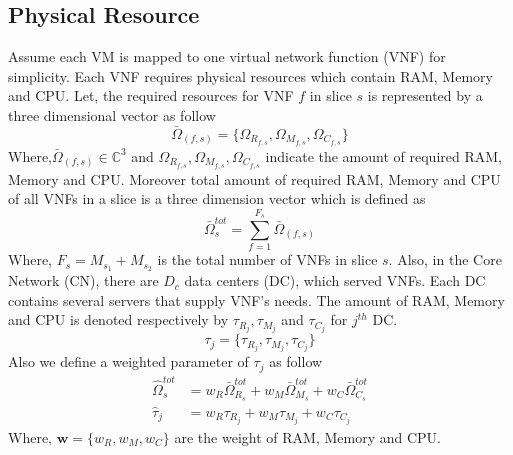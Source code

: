 \documentclass[conference]{IEEEtran}
\begin{document}
\subsection{Physical Resource}
Assume each VM is mapped to one virtual network function (VNF) for simplicity. Each VNF requires
physical resources which contain RAM, Memory and CPU.
Let, the required resources for VNF $f$ in slice $s$ is represented by a three dimensional vector as follow
\begin{equation}
\bar{\Omega}_{(f,s)} = \{\Omega_{R_{f,s}}, \Omega_{M_{f,s}}, \Omega_{C_{f,s}} \}
\end{equation} 
Where,$\bar{\Omega}_{(f,s)}\in \mathbb{C}^{3}$ and $\Omega_{R_{f,s}}, \Omega_{M_{f,s}}, \Omega_{C_{f,s}}$ indicate the amount of required RAM, Memory and CPU.
Moreover total amount of required RAM, Memory and CPU of all VNFs in a slice is a three dimension vector which is defined as
\begin{equation}
\bar{\Omega}_{s}^{tot} = \sum_{f=1}^{F_s}\bar{\Omega}_{(f,s)}
\end{equation}
Where, $F_s = M_{s_1} + M_{s_2}$ is the total number of VNFs in slice $s$.
\newline
Also, in the Core Network (CN), there are $D_c$ data centers (DC), which served VNFs. Each DC contains several servers that supply VNF's needs.
The amount of RAM, Memory and CPU is denoted respectively by $\tau_{R_{j}}, \tau_{M_{j}}$ and $\tau_{C_{j}} $ for $j^{th}$ DC.
\begin{equation*}
\tau_j = \{\tau_{R_{j}}, \tau_{M_{j}}, \tau_{C_{j}} \}
\end{equation*}
Also we define a weighted parameter of $\tau_j$ as follow
\begin{equation}\label{wt}
\begin{split}
\hat{\Omega}_{s}^{tot} &= w_R \bar{\Omega}_{R_s}^{tot} + w_M \bar{\Omega}_{M_s}^{tot} + w_C \bar{\Omega}_{C_s}^{tot} \\
\hat{\tau}_j &= w_R \tau_{R_{j}} + w_M \tau_{M_{j}} + w_C \tau_{C_{j}}
\end{split}
\end{equation}
Where, $\boldsymbol{w} = \{w_R, w_M, w_C\}$ are the weight of RAM, Memory and CPU.
\end{document}
